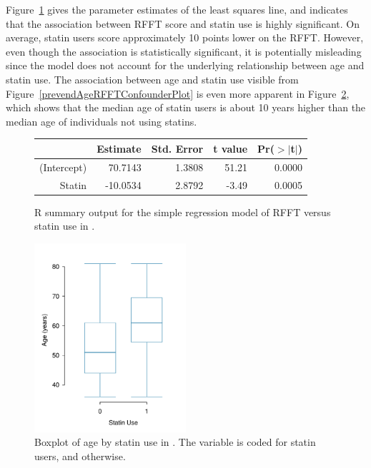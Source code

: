 Figure~\ref{prevendRFFTStatinRegression} gives the parameter estimates of the least squares line, and indicates that the association between RFFT score and statin use is highly significant. On average, statin users score approximately 10 points lower on the RFFT. However, even though the association is statistically significant, it is potentially misleading since the model does not account for the underlying relationship between age and statin use. The association between age and statin use visible from Figure~\ref{prevendAgeRFFTConfounderPlot} is even more apparent in Figure~\ref{prevendStatinAgeBoxPlot}, which shows that the median age of statin users is about 10 years higher than the median age of individuals not using statins. 

\begin{figure}[ht]
\centering
\begin{tabular}{rrrrr}
  \hline
 & Estimate & Std. Error & t value & Pr($>$$|$t$|$) \\ 
  \hline
(Intercept) & 70.7143 & 1.3808 & 51.21 & 0.0000 \\ 
  Statin & -10.0534 & 2.8792 & -3.49 & 0.0005 \\ 
   \hline
\end{tabular}
\caption{\textsf{R} summary output for the simple regression model of RFFT versus statin use in .} 
\label{prevendRFFTStatinRegression}
\end{figure}

 \begin{figure}[h]
 	\centering
 	\includegraphics[width=0.5\textwidth]
 	{ch_multiple_linear_regression_oi_biostat/figures/prevendStatinAgeBoxPlot/prevendStatinAgeBoxPlot.pdf}
 	\caption{Boxplot of age by statin use in . The variable  is coded  for statin users, and  otherwise.}
 	\label{prevendStatinAgeBoxPlot}
 \end{figure}

